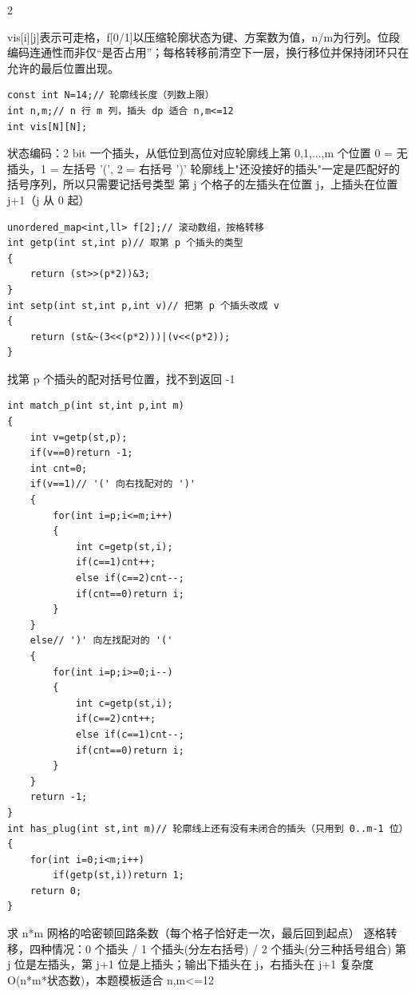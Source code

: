 \documentclass[UTF8,fontset=fandol,a4paper,twoside]{ctexart}
\newcommand{\note}[1]{{\fontsize{10}{12}\selectfont #1\par}}
\begin{document}
\begin{multicols}{2}
\note{vis[\allowbreak{}i]\allowbreak{}[\allowbreak{}j]\allowbreak{}表示可走格，f[\allowbreak{}0/\allowbreak{}1]\allowbreak{}以压缩轮廓状态为键、方案数为值，n/\allowbreak{}m为行列。位段编码连通性而非仅“是否占用”；每格转移前清空下一层，换行移位并保持闭环只在允许的最后位置出现。}
\begin{lstlisting}
const int N=14;// 轮廓线长度（列数上限）
int n,m;// n 行 m 列，插头 dp 适合 n,m<=12
int vis[N][N];
\end{lstlisting}
\note{状态编码：2 bit 一个插头，从低位到高位对应轮廓线上第 0,\allowbreak{}1,\allowbreak{}.\allowbreak{}.\allowbreak{}.\allowbreak{},\allowbreak{}m 个位置 0 =\allowbreak{} 无插头，1 =\allowbreak{} 左括号 '(\allowbreak{}',\allowbreak{} 2 =\allowbreak{} 右括号 ')\allowbreak{}' 轮廓线上"还没接好的插头"一定是匹配好的括号序列，所以只需要记括号类型 第 j 个格子的左插头在位置 j，上插头在位置 j+\allowbreak{}1（j 从 0 起）}
\begin{lstlisting}
unordered_map<int,ll> f[2];// 滚动数组，按格转移
int getp(int st,int p)// 取第 p 个插头的类型
{
    return (st>>(p*2))&3;
}
int setp(int st,int p,int v)// 把第 p 个插头改成 v
{
    return (st&~(3<<(p*2)))|(v<<(p*2));
}
\end{lstlisting}
\note{找第 p 个插头的配对括号位置，找不到返回 -\allowbreak{}1}
\begin{lstlisting}
int match_p(int st,int p,int m)
{
    int v=getp(st,p);
    if(v==0)return -1;
    int cnt=0;
    if(v==1)// '(' 向右找配对的 ')'
    {
        for(int i=p;i<=m;i++)
        {
            int c=getp(st,i);
            if(c==1)cnt++;
            else if(c==2)cnt--;
            if(cnt==0)return i;
        }
    }
    else// ')' 向左找配对的 '('
    {
        for(int i=p;i>=0;i--)
        {
            int c=getp(st,i);
            if(c==2)cnt++;
            else if(c==1)cnt--;
            if(cnt==0)return i;
        }
    }
    return -1;
}
int has_plug(int st,int m)// 轮廓线上还有没有未闭合的插头（只用到 0..m-1 位）
{
    for(int i=0;i<m;i++)
        if(getp(st,i))return 1;
    return 0;
}
\end{lstlisting}
\note{求 n*m 网格的哈密顿回路条数（每个格子恰好走一次，最后回到起点） 逐格转移，四种情况：0 个插头 /\allowbreak{} 1 个插头(\allowbreak{}分左右括号)\allowbreak{} /\allowbreak{} 2 个插头(\allowbreak{}分三种括号组合)\allowbreak{} 第 j 位是左插头，第 j+\allowbreak{}1 位是上插头；输出下插头在 j，右插头在 j+\allowbreak{}1 复杂度 O(\allowbreak{}n*m*状态数)\allowbreak{}，本题模板适合 n,\allowbreak{}m<\allowbreak{}=\allowbreak{}12}
\begin{lstlisting}

\end{lstlisting}
\end{multicols}
\end{document}
